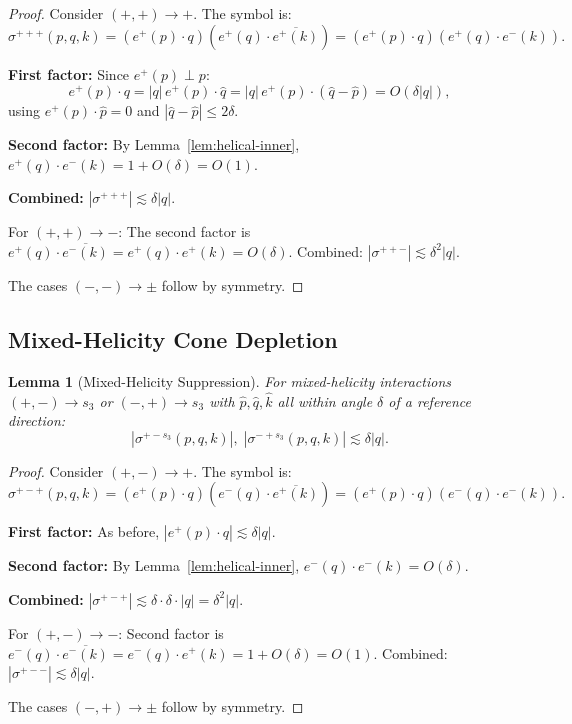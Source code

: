 \documentclass[11pt]{article}
\newtheorem{lemma}[theorem]{Lemma}
\theoremstyle{definition}
\begin{document}
\begin{proof}
Consider $(+,+) \to +$. The symbol is:
\begin{equation}
\sigma^{+++}(p,q,k) = (e^+(p) \cdot q)(e^+(q) \cdot \overline{e^+(k)}) = (e^+(p) \cdot q)(e^+(q) \cdot e^-(k)).
\end{equation}

\textbf{First factor:} Since $e^+(p) \perp p$:
\begin{equation}
e^+(p) \cdot q = |q| \, e^+(p) \cdot \hat{q} = |q| \, e^+(p) \cdot (\hat{q} - \hat{p}) = O(\delta |q|),
\end{equation}
using $e^+(p) \cdot \hat{p} = 0$ and $|\hat{q} - \hat{p}| \leq 2\delta$.

\textbf{Second factor:} By Lemma~\ref{lem:helical-inner}, $e^+(q) \cdot e^-(k) = 1 + O(\delta) = O(1)$.

\textbf{Combined:} $|\sigma^{+++}| \lesssim \delta |q|$.

For $(+,+) \to -$: The second factor is $e^+(q) \cdot \overline{e^-(k)} = e^+(q) \cdot e^+(k) = O(\delta)$. Combined: $|\sigma^{++-}| \lesssim \delta^2 |q|$.

The cases $(-,-) \to \pm$ follow by symmetry.
\end{proof}

\subsection{Mixed-Helicity Cone Depletion}

\begin{lemma}[Mixed-Helicity Suppression]\label{lem:mixed-cone}
For mixed-helicity interactions $(+,-) \to s_3$ or $(-,+) \to s_3$ with $\hat{p}, \hat{q}, \hat{k}$ all within angle $\delta$ of a reference direction:
\begin{equation}
|\sigma^{+-s_3}(p,q,k)|, \; |\sigma^{-+s_3}(p,q,k)| \lesssim \delta |q|.
\end{equation}
\end{lemma}

\begin{proof}
Consider $(+,-) \to +$. The symbol is:
\begin{equation}
\sigma^{+-+}(p,q,k) = (e^+(p) \cdot q)(e^-(q) \cdot \overline{e^+(k)}) = (e^+(p) \cdot q)(e^-(q) \cdot e^-(k)).
\end{equation}

\textbf{First factor:} As before, $|e^+(p) \cdot q| \lesssim \delta |q|$.

\textbf{Second factor:} By Lemma~\ref{lem:helical-inner}, $e^-(q) \cdot e^-(k) = O(\delta)$.

\textbf{Combined:} $|\sigma^{+-+}| \lesssim \delta \cdot \delta \cdot |q| = \delta^2 |q|$.

For $(+,-) \to -$: Second factor is $e^-(q) \cdot \overline{e^-(k)} = e^-(q) \cdot e^+(k) = 1 + O(\delta) = O(1)$. Combined: $|\sigma^{+--}| \lesssim \delta |q|$.

The cases $(-,+) \to \pm$ follow by symmetry.
\end{proof}
\end{document}
